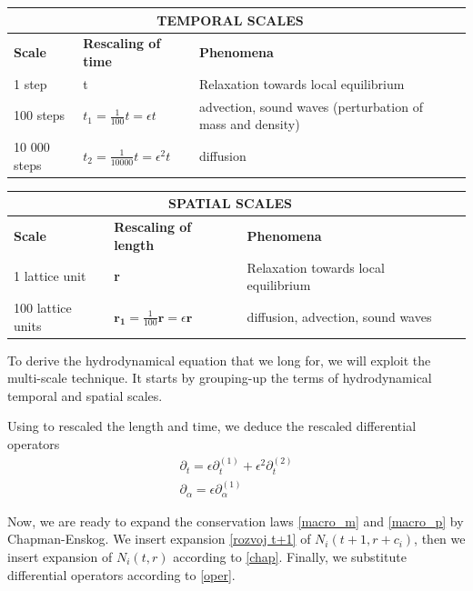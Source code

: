 \begin{center} \label{scalings}
    \begin{tabular}{| l | l | l | l |}
    \hline
    \multicolumn{3}{|c|}{TEMPORAL SCALES}\\ \hline
    \textbf{Scale} & \textbf{Rescaling of time} & \textbf{Phenomena} \\ \hline
    1 step & t & Relaxation towards local equilibrium \\ \hline
    100 steps & $t_1 = \frac{1}{100} t = \epsilon t$ & advection, sound waves (perturbation of mass and density) \\ \hline
    10 000 steps & $t_2 = \frac{1}{10000} t = \epsilon^2 t$ & diffusion \\ \hline
    \end{tabular}
\end{center}


\begin{center}
    \begin{tabular}{| l | l | l | l |}
    \hline
    \multicolumn{3}{|c|}{SPATIAL SCALES}\\ \hline
    \textbf{Scale} & \textbf{Rescaling of length} & \textbf{Phenomena} \\ \hline
    1 lattice unit & \textbf{r} & Relaxation towards local equilibrium \\ \hline
    100 lattice units & $\bm{r_1} = \frac{1}{100} \bm{r} = \epsilon \bm{r}$ & diffusion, advection, sound waves\\ \hline
    \end{tabular}
\end{center}

To derive the hydrodynamical equation that we long for, we will exploit the multi-scale technique. It starts by grouping-up the terms of hydrodynamical temporal and spatial scales.


\bigskip
Using to rescaled the length and time, we deduce the rescaled differential operators
\begin{equation} \label{oper}
\begin{split}
\partial_t = \epsilon \partial_t^{(1)} + \epsilon^2 \partial_t^{(2)} \\
\partial_{\alpha} = \epsilon \partial_{\alpha}^{(1)}
\end{split}
\end{equation}

Now, we are ready to expand the conservation laws \ref{macro_m} and \ref{macro_p} by Chapman-Enskog. We insert expansion \ref{rozvoj t+1} of $N_i(t+1,r+c_i)$, then we insert expansion of $N_i(t,r)$ according to \ref{chap}. Finally, we substitute differential operators according to \ref{oper}.

